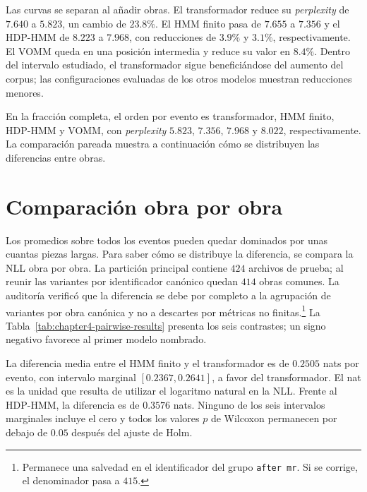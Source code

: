 Las curvas se separan al añadir obras. El transformador reduce su \emph{perplexity} de $7.640$ a $5.823$, un cambio de $23.8\%$. El HMM finito pasa de $7.655$ a $7.356$ y el HDP-HMM de $8.223$ a $7.968$, con reducciones de $3.9\%$ y $3.1\%$, respectivamente. El VOMM queda en una posición intermedia y reduce su valor en $8.4\%$. Dentro del intervalo estudiado, el transformador sigue beneficiándose del aumento del corpus; las configuraciones evaluadas de los otros modelos muestran reducciones menores.

En la fracción completa, el orden por evento es transformador, HMM finito, HDP-HMM y VOMM, con \emph{perplexity} $5.823$, $7.356$, $7.968$ y $8.022$, respectivamente. La comparación pareada muestra a continuación cómo se distribuyen las diferencias entre obras.

\FloatBarrier

\section{Comparación obra por obra}

Los promedios sobre todos los eventos pueden quedar dominados por unas cuantas piezas largas. Para saber cómo se distribuye la diferencia, se compara la NLL obra por obra. La partición principal contiene $424$ archivos de prueba; al reunir las variantes por identificador canónico quedan $414$ obras comunes. La auditoría verificó que la diferencia se debe por completo a la agrupación de variantes por obra canónica y no a descartes por métricas no finitas.\footnote{Permanece una salvedad en el identificador del grupo \texttt{after mr}. Si se corrige, el denominador pasa a $415$.} La Tabla~\ref{tab:chapter4-pairwise-results} presenta los seis contrastes; un signo negativo favorece al primer modelo nombrado.

\begin{table}[H]
\centering
\caption{Comparaciones pareadas de NLL por obra en la fracción completa. Los intervalos \emph{bootstrap} marginales corresponden a la diferencia media; los valores $p$ de Wilcoxon se ajustaron conjuntamente mediante Holm.}
\label{tab:chapter4-pairwise-results}
\resizebox{\textwidth}{!}{}
\end{table}

La diferencia media entre el HMM finito y el transformador es de $0.2505$ nats por evento, con intervalo marginal $[0.2367,0.2641]$, a favor del transformador. El nat es la unidad que resulta de utilizar el logaritmo natural en la NLL. Frente al HDP-HMM, la diferencia es de $0.3576$ nats. Ninguno de los seis intervalos marginales incluye el cero y todos los valores $p$ de Wilcoxon permanecen por debajo de $0.05$ después del ajuste de Holm.

